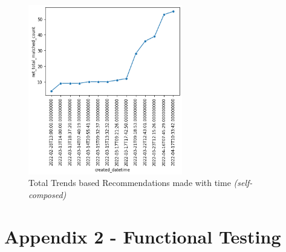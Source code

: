 \begin{figure}[h!]
\centering
\includegraphics[width=0.6\textwidth]{images/Testing/trends-matches-eval2.png}
\caption{Total Trends based Recommendations made with time \textit{(self-composed)}}
\label{fig:trends-recsys-total-matches}
\end{figure}

\section*{Appendix 2 - Functional Testing}

